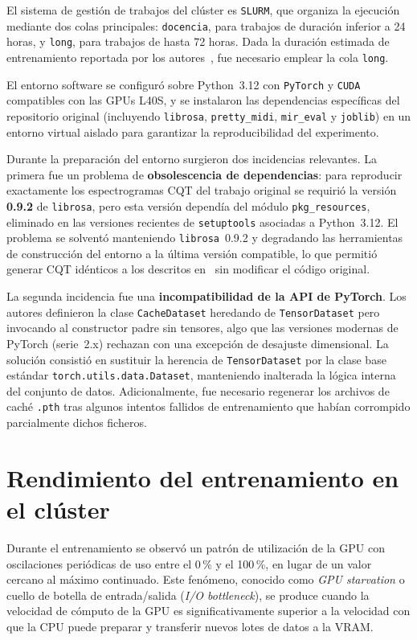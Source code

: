 \documentclass[11pt,spanish,listoffigures,listoftables]{tfgetsinf}
\begin{document}
El sistema de gestión de trabajos del clúster es \texttt{SLURM}, que organiza
la ejecución mediante dos colas principales: \texttt{docencia}, para trabajos
de duración inferior a 24 horas, y \texttt{long}, para trabajos de hasta
72 horas. Dada la duración estimada de entrenamiento reportada por los
autores~\cite{wang2025mftfilm}, fue necesario emplear la cola \texttt{long}.

El entorno software se configuró sobre Python~3.12 con \texttt{PyTorch} y
\texttt{CUDA} compatibles con las GPUs L40S, y se instalaron las dependencias
específicas del repositorio original (incluyendo \texttt{librosa},
\texttt{pretty\_midi}, \texttt{mir\_eval} y \texttt{joblib}) en un entorno
virtual aislado para garantizar la reproducibilidad del experimento.

Durante la preparación del entorno surgieron dos incidencias relevantes. La
primera fue un problema de \textbf{obsolescencia de dependencias}: para
reproducir exactamente los espectrogramas CQT del trabajo original se requirió
la versión \textbf{0.9.2} de \texttt{librosa}, pero esta versión dependía del
módulo \texttt{pkg\_resources}, eliminado en las versiones recientes de
\texttt{setuptools} asociadas a Python~3.12. El problema se solventó manteniendo
\texttt{librosa}~0.9.2 y degradando las herramientas de construcción del
entorno a la última versión compatible, lo que permitió generar CQT idénticos a
los descritos en~\cite{wang2025mftfilm} sin modificar el código original.

La segunda incidencia fue una \textbf{incompatibilidad de la API de PyTorch}.
Los autores definieron la clase \texttt{CacheDataset} heredando de
\texttt{TensorDataset} pero invocando al constructor padre sin tensores, algo
que las versiones modernas de PyTorch (serie~2.x) rechazan con una excepción de
desajuste dimensional. La solución consistió en sustituir la herencia de
\texttt{TensorDataset} por la clase base estándar
\texttt{torch.utils.data.Dataset}, manteniendo inalterada la lógica interna del
conjunto de datos. Adicionalmente, fue necesario regenerar los archivos de
caché \texttt{.pth} tras algunos intentos fallidos de entrenamiento que habían
corrompido parcialmente dichos ficheros.

\section{Rendimiento del entrenamiento en el clúster}

Durante el entrenamiento se observó un patrón de utilización de la GPU con
oscilaciones periódicas de uso entre el 0\,\% y el 100\,\%, en lugar de un valor
cercano al máximo continuado. Este fenómeno, conocido como
\textit{GPU starvation} o cuello de botella de entrada/salida
(\textit{I/O bottleneck}), se produce cuando la velocidad de cómputo de la
GPU es significativamente superior a la velocidad con que la CPU puede preparar
y transferir nuevos lotes de datos a la VRAM.
\end{document}
